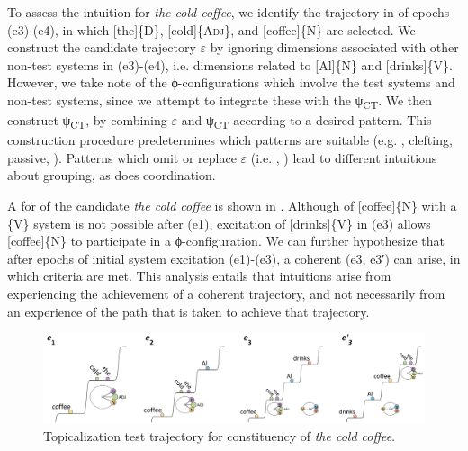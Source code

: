   To assess the  intuition for \textit{the cold coffee}, we identify the trajectory in {} of epochs (e3)-(e4), in which [the]\{D\}, [cold]\{A\textsc{dj}\}, and [coffee]\{N\} are selected. We construct the candidate trajectory $\varepsilon $ by ignoring  dimensions associated with other non-test systems in (e3)-(e4), i.e. dimensions related to [Al]\{N\} and [drinks]\{V\}. However, we take note of the ϕ-configurations which involve the test systems and non-test systems, since we attempt to integrate these with the   ψ\textsubscript{CT}. We then construct ψ\textsubscript{CT}, by combining $\varepsilon $ and ψ\textsubscript{CT} according to a desired pattern. This construction procedure predetermines which patterns are suitable (e.g. , clefting, passive, ). Patterns which omit or replace $\varepsilon $ (i.e. , ) lead to different intuitions about grouping, as does coordination.

  A  for  of the candidate \textit{the cold coffee} is shown in {}. Although  of [coffee]\{N\} with a \{V\} system is not possible after (e1), excitation of [drinks]\{V\} in (e3) allows [coffee]\{N\} to participate in a ϕ-configuration. We can further hypothesize that after epochs of initial system excitation (e1)-(e3), a coherent  (e3, e3′) can arise, in which  criteria are met. This analysis entails that  intuitions arise from experiencing the achievement of a coherent trajectory, and not necessarily from an experience of the path that is taken to achieve that trajectory.

  
\begin{figure}
\includegraphics[width=\textwidth]{figures/Tilsen-img138.png}
\caption{Topicalization test trajectory for constituency of \textit{the cold coffee}.}
\label{fig:6:19}
\end{figure}
 

